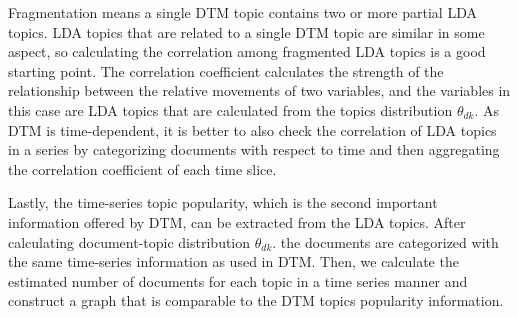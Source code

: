 Fragmentation means a single DTM topic contains two or more partial LDA topics. LDA topics that are related to a single DTM topic are similar in some aspect, so calculating the correlation among fragmented LDA topics is a good starting point. The correlation coefficient calculates the strength of the relationship between the relative movements of two variables, and the variables in this case are LDA topics that are calculated from the topics distribution $\theta_{dk}$. As DTM is time-dependent, it is better to also check the correlation of LDA topics in a series by categorizing documents with respect to time and then aggregating the correlation coefficient of each time slice.

Lastly, the time-series topic popularity, which is the second important information offered by DTM, can be extracted from the LDA topics. After calculating document-topic distribution $\theta_{dk}$. the documents are categorized with the same time-series information as used in DTM. Then, we calculate the estimated number of documents for each topic in a time series manner and construct a graph that is comparable to the DTM topics popularity information.